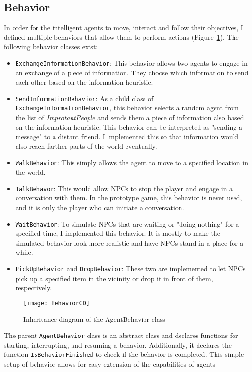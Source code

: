 \subsection{Behavior}
In order for the intelligent agents to move, interact and follow their objectives, I defined multiple behaviors that allow them to perform actions (Figure~\ref{fig:behaviorCD}). The following behavior classes exist:
\begin{itemize}
	\item \verb|ExchangeInformationBehavior|: This behavior allows two agents to engage in an exchange of a piece of information. They choose which information to send each other based on the information heuristic.
	\item \verb|SendInformationBehavior|: As a child class of \verb|ExchangeInformationBehavior|, this behavior selects a random agent from the list of \textit{ImprotantPeople} and sends them a piece of information also based on the information heuristic. This behavior can be interpreted as "sending a message" to a distant friend. I implemented this so that information would also reach farther parts of the world eventually.
	\item \verb|WalkBehavior|: This simply allows the agent to move to a specified location in the world.
	\item \verb|TalkBehavor|: This would allow NPCs to stop the player and engage in a conversation with them. In the prototype game, this behavior is never used, and it is only the player who can initiate a conversation.
	\item \verb|WaitBehavior|: To simulate NPCs that are waiting or "doing nothing" for a specified time, I implemented this behavior. It is mostly to make the simulated behavior look more realistic and have NPCs stand in a place for a while.
	\item \verb|PickUpBehavior| and \verb|DropBehavior|: These two are implemented to let NPCs pick up a specified item in the vicinity or drop it in front of them, respectively.
\end{itemize}
\begin{figure}
	\centering
	\texttt{[image: BehaviorCD]}
	\caption{Inheritance diagram of the AgentBehavior class}
	\label{fig:behaviorCD}
\end{figure}
The parent \verb|AgentBehavior| class is an abstract class and declares functions for starting, interrupting, and resuming a behavior. Additionally, it declares the function \verb|IsBehaviorFinished| to check if the behavior is completed. This simple setup of behavior allows for easy extension of the capabilities of agents.
